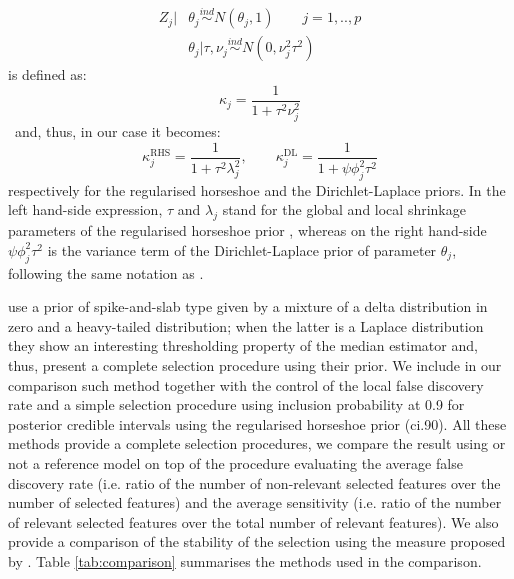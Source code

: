 \documentclass[american,]{article}
\theoremstyle{definition}
\begin{document}
\begin{align}
Z_{j}|&\theta_{j}\overset{ind}{\sim}N(\theta_{j},1) \qquad j=1,..,p \\
&\theta_{j}|\tau,\nu_{j}\overset{ind}{\sim}N(0,\nu_{j}^{2}\tau^{2})
\end{align}
is defined as:
\begin{equation}
\kappa_{j}=\frac{1}{1+\tau^{2}\nu_{j}^{2}}
\end{equation}
\
and, thus, in our case it becomes:
\begin{equation}
\kappa_{j}^{\text{RHS}}=\frac{1}{1+\tau^{2}\lambda_{j}^{2}}, \qquad \kappa_{j}^{\text{DL}}=\frac{1}{1+\psi\phi_{j}^{2}\tau^{2}}
\end{equation}
respectively for the regularised horseshoe and the Dirichlet-Laplace priors. In the left hand-side expression, $\tau$ and $\lambda_{j}$ stand for the global and local shrinkage parameters of the regularised horseshoe prior \cite[notation and further details in][]{paper:rhs}, whereas on the right hand-side $\psi\phi_{j}^{2}\tau^{2}$ is the variance term of the Dirichlet-Laplace prior of parameter $\theta_{j}$, following the same notation as \cite{paper:dirichlet_laplace}.


\cite{johnstone2004needles} use a prior of spike-and-slab type \citep{paper:spike_slab_mitchell} given by a mixture of a delta distribution in zero and a heavy-tailed distribution; when the latter is a Laplace distribution they show an interesting thresholding property of the median estimator and, thus, present a complete selection procedure using their prior. We include in our comparison such method together with the control of the local false discovery rate \citep{efron2012large, paper:efron} and a simple selection procedure using inclusion probability at 0.9 for posterior credible intervals using the regularised horseshoe prior (ci.90). All these methods provide a complete selection procedures, we compare the result using or not a reference model on top of the procedure evaluating the average false discovery rate (i.e. ratio of the number of non-relevant selected features over the number of selected features) and the average sensitivity (i.e. ratio of the number of relevant selected features over the total number of relevant features). We also provide a comparison of the stability of the selection using the measure proposed by \cite{paper:stability}. Table \ref{tab:comparison} summarises the methods used in the comparison.
\end{document}
